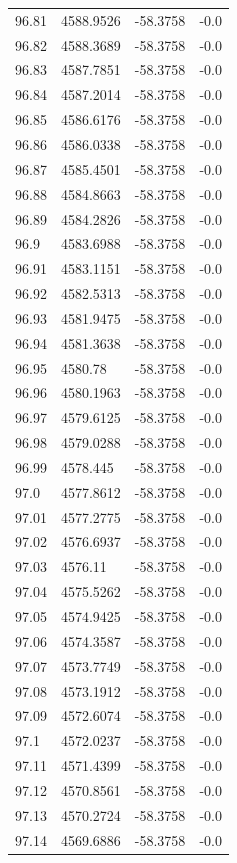 \begin{table}[H]
\begin{tabular}{llll}
96.81 & 4588.9526 & -58.3758 & -0.0 \\
96.82 & 4588.3689 & -58.3758 & -0.0 \\
96.83 & 4587.7851 & -58.3758 & -0.0 \\
96.84 & 4587.2014 & -58.3758 & -0.0 \\
96.85 & 4586.6176 & -58.3758 & -0.0 \\
96.86 & 4586.0338 & -58.3758 & -0.0 \\
96.87 & 4585.4501 & -58.3758 & -0.0 \\
96.88 & 4584.8663 & -58.3758 & -0.0 \\
96.89 & 4584.2826 & -58.3758 & -0.0 \\
96.9 & 4583.6988 & -58.3758 & -0.0 \\
96.91 & 4583.1151 & -58.3758 & -0.0 \\
96.92 & 4582.5313 & -58.3758 & -0.0 \\
96.93 & 4581.9475 & -58.3758 & -0.0 \\
96.94 & 4581.3638 & -58.3758 & -0.0 \\
96.95 & 4580.78 & -58.3758 & -0.0 \\
96.96 & 4580.1963 & -58.3758 & -0.0 \\
96.97 & 4579.6125 & -58.3758 & -0.0 \\
96.98 & 4579.0288 & -58.3758 & -0.0 \\
96.99 & 4578.445 & -58.3758 & -0.0 \\
97.0 & 4577.8612 & -58.3758 & -0.0 \\
97.01 & 4577.2775 & -58.3758 & -0.0 \\
97.02 & 4576.6937 & -58.3758 & -0.0 \\
97.03 & 4576.11 & -58.3758 & -0.0 \\
97.04 & 4575.5262 & -58.3758 & -0.0 \\
97.05 & 4574.9425 & -58.3758 & -0.0 \\
97.06 & 4574.3587 & -58.3758 & -0.0 \\
97.07 & 4573.7749 & -58.3758 & -0.0 \\
97.08 & 4573.1912 & -58.3758 & -0.0 \\
97.09 & 4572.6074 & -58.3758 & -0.0 \\
97.1 & 4572.0237 & -58.3758 & -0.0 \\
97.11 & 4571.4399 & -58.3758 & -0.0 \\
97.12 & 4570.8561 & -58.3758 & -0.0 \\
97.13 & 4570.2724 & -58.3758 & -0.0 \\
97.14 & 4569.6886 & -58.3758 & -0.0 \\

\end{tabular}
\end{table}
